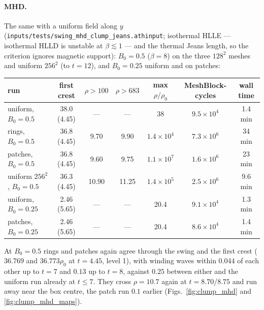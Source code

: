 \documentclass[11pt]{article}
\newcommand{\file}[1]{\texttt{\small #1}}
\begin{document}
\paragraph{MHD.} The same with a uniform field along $y$
(\file{inputs/tests/swing\_mhd\_clump\_jeans.athinput}; isothermal HLLE --- isothermal HLLD
is unstable at $\beta \lesssim 1$ --- and the thermal Jeans length, so the criterion ignores
magnetic support): $B_0 = 0.5$ ($\beta = 8$) on the three $128^2$ meshes and uniform
$256^2$ (to $t = 12$), and $B_0 = 0.25$ uniform and on patches:

\begin{center}
\small
\begin{tabular}{@{}lcccccc@{}}
\toprule
run & first crest & $\rho > 100$ & $\rho > 683$ & max $\rho/\rho_0$ & MeshBlock-cycles & wall time \\
\midrule
uniform, $B_0 = 0.5$   & 38.0 (4.45) & ---  & ---  & 38          & $9.5\times10^4$ & 1.4 min \\
rings, $B_0 = 0.5$     & 36.8 (4.45) & 9.70 & 9.90 & $1.4\times10^4$ & $7.3\times10^6$ & 34 min \\
patches, $B_0 = 0.5$   & 36.8 (4.45) & 9.60 & 9.75 & $1.1\times10^7$ & $1.6\times10^6$ & 23 min \\
uniform $256^2$, $B_0 = 0.5$ & 36.3 (4.45) & 10.90 & 11.25 & $1.4\times10^5$ & $2.5\times10^6$ & 9.6 min \\
uniform, $B_0 = 0.25$  & 2.46 (5.65) & ---  & ---  & 20.4        & $9.1\times10^4$ & 1.3 min \\
patches, $B_0 = 0.25$  & 2.46 (5.65) & ---  & ---  & 20.4        & $8.6\times10^4$ & 1.4 min \\
\bottomrule
\end{tabular}
\end{center}

\noindent
At $B_0 = 0.5$ rings and patches again agree through the swing and the first crest
($36.769$ and $36.773\rho_0$ at $t = 4.45$, level 1), with winding waves within $0.044$ of
each other up to $t = 7$ and $0.13$ up to $t = 8$, against $0.25$ between either and the
uniform run already at $t \le 7$. They cross $\rho = 10.7$ again at $t = 8.70$/$8.75$
and run away near the box centre, the patch run $0.1$ earlier
(Figs.~\ref{fig:clump_mhd} and \ref{fig:clump_mhd_maps}).
\end{document}
